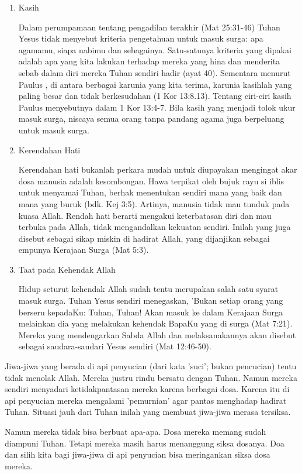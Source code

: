 \documentclass[a5paper,headsepline,titlepage,10pt,nnormalheadings,DIVcalc]{scrbook}
\begin{document}
\begin{enumerate}
\item Kasih

Dalam perumpamaan tentang pengadilan terakhir (Mat 25:31-46) Tuhan Yesus tidak menyebut kriteria pengetahuan untuk masuk surga: apa agamamu, siapa nabimu dan sebagainya. Satu-satunya kriteria yang dipakai adalah apa yang kita lakukan terhadap mereka yang hina dan menderita sebab dalam diri mereka Tuhan sendiri hadir (ayat 40). Sementara menurut Paulus , di antara berbagai karunia yang kita terima, karunia kasihlah yang paling besar dan tidak berkesudahan (1 Kor 13:8.13). Tentang ciri-ciri kasih Paulus menyebutnya dalam 1 Kor 13:4-7. Bila kasih yang menjadi tolok ukur masuk surga, niscaya semua orang tanpa pandang agama juga berpeluang untuk masuk surga.

\item Kerendahan Hati

Kerendahan hati bukanlah perkara mudah untuk diupayakan mengingat akar dosa manusia adalah kesombongan. Hawa terpikat oleh bujuk rayu si iblis untuk menyamai Tuhan, berhak menentukan sendiri mana yang baik dan mana yang buruk (bdk. Kej 3:5). Artinya, manusia tidak mau tunduk pada kuasa Allah. Rendah hati berarti mengakui keterbatasan diri dan mau terbuka pada Allah, tidak mengandalkan kekuatan sendiri. Inilah yang juga disebut sebagai sikap miskin di hadirat Allah, yang dijanjikan sebagai empunya Kerajaan Surga (Mat 5:3).

\item Taat pada Kehendak Allah

Hidup seturut kehendak Allah sudah tentu merupakan salah satu syarat masuk surga. Tuhan Yesus sendiri menegaskan, 'Bukan setiap orang yang berseru kepadaKu: Tuhan, Tuhan! Akan masuk ke dalam Kerajaan Surga melainkan dia yang melakukan kehendak BapaKu yang di surga (Mat 7:21).
Mereka yang mendengarkan Sabda Allah dan melaksanakannya akan disebut sebagai saudara-saudari Yesus sendiri (Mat 12:46-50).
\end{enumerate}

Jiwa-jiwa yang berada di api penyucian (dari kata 'suci'; bukan pencucian) tentu tidak menolak Allah. Mereka justru rindu bersatu dengan Tuhan. Namun mereka sendiri menyadari ketidakpantasan mereka karena berbagai dosa. Karena itu di api penyucian mereka mengalami 'pemurnian' agar pantas menghadap hadirat Tuhan. Situasi jauh dari Tuhan inilah yang membuat jiwa-jiwa merasa tersiksa.

Namun mereka tidak bisa berbuat apa-apa. Dosa mereka memang sudah diampuni Tuhan. Tetapi mereka masih harus menanggung siksa dosanya. Doa dan silih kita bagi jiwa-jiwa di api penyucian bisa meringankan siksa dosa mereka.
\end{document}

